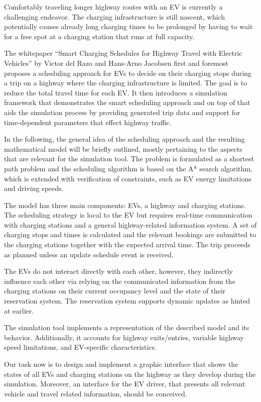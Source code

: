 \documentclass[hidelinks]{sig-alternate}
\begin{document}
Comfortably traveling longer highway routes with an EV is currently a challenging endeavor. The charging
infrastructure is still nascent, which potentially causes already long charging times to be prolonged by having to
wait for a free spot at a charging station that runs at full capacity.

The whitepaper ``Smart Charging Schedules for Highway Travel with Electric Vehicles'' \cite{3} by Victor del Razo and
Hans-Arno Jacobsen first and foremost proposes a scheduling approach for EVs to decide on their charging stops during
a trip on a highway where the charging infrastructure is limited. The goal is to reduce the total travel time for
each EV. It then introduces a simulation framework that demonstrates the smart scheduling approach and on top of that
aids the simulation process by providing generated trip data and support for time-dependent parameters that effect
highway traffic.

In the following, the general idea of the scheduling approach and the resulting mathematical model will be briefly
outlined, mostly pertaining to the aspects that are relevant for the simulation tool. The problem is formulated as a
shortest path problem and the scheduling algorithm is based on the A* search algorithm, which is extended with
verification of constraints, such as EV energy limitations and driving speeds.

The model has three main components: EVs, a highway and charging stations. The scheduling strategy is local to the EV
but requires real-time communication with charging stations and a general highway-related information system. A set
of charging stops and times is calculated and the relevant bookings are submitted to the charging stations together
with the expected arrival time. The trip proceeds as planned unless an update schedule event is received.

The EVs do not interact directly with each other, however, they indirectly influence each other via relying on the
communicated information from the charging stations on their current occupancy level and the state of their reservation
system. The reservation system supports dynamic updates as hinted at earlier.

The simulation tool implements a representation of the described model and its behavior. Additionally, it accounts for
highway exits/entries, variable highway speed limitations, and EV-specific characteristics.

Our task now is to design and implement a graphic interface that shows the states of all EVs and charging stations on
the highway as they develop during the simulation. Moreover, an interface for the EV driver, that presents all
relevant vehicle and travel related information, should be conceived.
\end{document}
